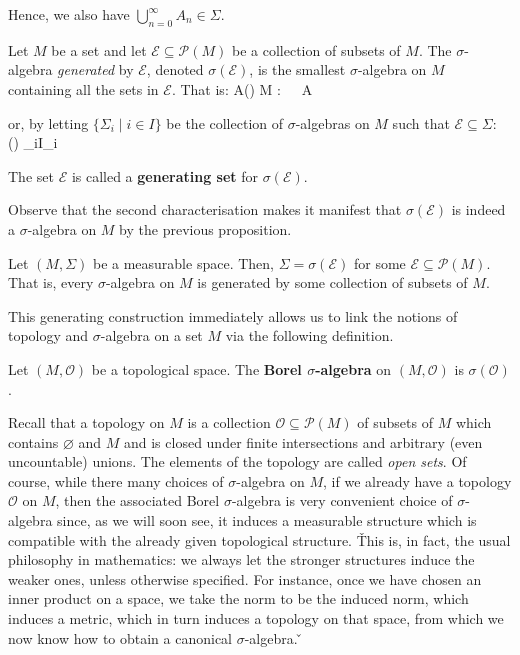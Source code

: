 Hence, we also have $\bigcup_{n=0}^{\infty}{A_n} \in \Sigma$. \qedhere
\een
\eq

Let $M$ be a set and let $\mathcal{E}\subseteq\mathscr{P}(M)$ be a collection of subsets of $M$. The $\sigma$-algebra
\emph{generated} by $\mathcal{E}$, denoted $\sigma(\mathcal{E})$, is the smallest $\sigma$-algebra on $M$ containing
all the sets in $\mathcal{E}$. That is:
\bse
A\in\sigma() \quad \Leftrightarrow \quad {}\Sigma
{} M :\ \subseteq \Sigma \, \Rightarrow\, A\in \Sigma
\ese

or, by letting $\{\Sigma_i\mid i\in I\}$ be the collection of $\sigma$-algebras on $M$ such that
$\mathcal{E}\subseteq \Sigma$:
\bse
\sigma() \coloneqq \bigcap_{i\in I}\Sigma_i
\ese

The set $\mathcal{E}$ is called a \textbf{generating set} for $\sigma (\mathcal{E})$.
\ed

Observe that the second characterisation makes it manifest that $\sigma (\mathcal{E})$ is indeed a $\sigma$-algebra
on $M$ by the previous proposition.

\bt[]
Let $(M,\Sigma)$ be a measurable space. Then, $\Sigma=\sigma(\mathcal{E})$ for some $\mathcal{E}\subseteq\mathscr{P}
(M)$. That is, every $\sigma$-algebra on $M$ is generated by some collection of subsets of $M$.
\et

This generating construction immediately allows us to link the notions of topology and $\sigma$-algebra on a set $M$
via the following definition.

Let $(M,\mathcal{O})$ be a topological space. The \textbf{Borel $\sigma$-algebra} on $(M,\mathcal{O})$ is
$\sigma(\mathcal{O})$.
\ed

Recall that a topology on $M$ is a collection $\mathcal{O}\subseteq\mathscr{P}(M)$ of subsets of $M$ which contains
$\varnothing$ and $M$ and is closed under finite intersections and arbitrary (even uncountable) unions. The elements
of the topology are called \emph{open sets}. Of course, while there many choices of $\sigma$-algebra on $M$, if we
already have a topology $\mathcal{O}$ on $M$, then the associated Borel $\sigma$-algebra is very convenient choice of
$\sigma$-algebra since, as we will soon see, it induces a measurable structure which is compatible with the already
given topological structure. \v

This is, in fact, the usual philosophy in mathematics: we always let the stronger structures induce the weaker ones,
unless otherwise specified. For instance, once we have chosen an inner product on a space, we take the norm to be the
induced norm, which induces a metric, which in turn induces a topology on that space, from which we now know how to
obtain a canonical $\sigma$-algebra. \v

